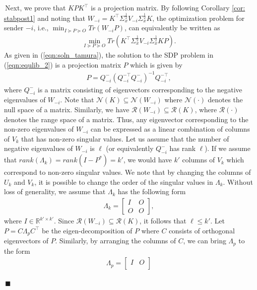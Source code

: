 \documentclass[12pt,journal,onecolumn]{IEEEtran}
\newenvironment{Proof}[1]{\medskip\par\noindent{\bf Proof:\,}\,#1}{{\mbox{\,$\blacksquare$}\par}}
\begin{document}
\begin{Proof}
Next, we prove that $KPK^\top$ is a projection matrix. By following Corollary \ref{cor: stabpost1} and noting that $W_{-i} =K^\top\Sigma_x^\frac{1}{2}V_{-i}\Sigma_x^{\frac{1}{2}}K $, the optimization problem for sender $-i$, i.e., $\min_{I\succeq P\succeq O} Tr(W_{-i}P)$, can equivalently be written as
\begin{align}\label{eqn:equlib_2}
    \min_{I\succeq P\succeq O} Tr(K^\top\Sigma_x^\frac{1}{2}V_{-i}\Sigma_x^{\frac{1}{2}}KP).
\end{align}
As given in (\ref{eqn:soln_tamura}), the solution to the SDP problem in (\ref{eqn:equlib_2}) is a projection matrix $P$ which is given by 
\begin{align}\label{eqn:projection_mat}
  P=Q_{-i}^{-}(Q_{-i}^{-\top} Q_{-i}^{-})^{-1}Q_{-i}^{-\top}, 
\end{align}
where $Q_{-i}^{-}$ is a matrix consisting of eigenvectors corresponding to the negative eigenvalues of $W_{-i}$. Note that $\mathcal{N}(K)\subseteq\mathcal{N}(W_{-i})$ where $\mathcal{N}(\cdot)$ denotes the null space of a matrix. Similarly, we have $\mathcal{R}(W_{-i})\subseteq\mathcal{R}(K)$, where $\mathcal{R}(\cdot)$ denotes the range space of a matrix. Thus, any eigenvector corresponding to the non-zero eigenvalues of $W_{-i}$ can be expressed as a linear combination of columns of $V_k$ that has non-zero singular values. Let us assume that the number of negative eigenvalues of $W_{-i}$ is $\ell$ (or equivalently $Q_{-i}^{-}$ has rank $\ell$). If we assume that $rank(\Lambda_k)=rank(I-P^*)=k'$, we would have $k'$ columns of $V_k$ which correspond to non-zero singular values. We note that by changing the columns of $U_k$ and $V_k$, it is possible to change the order of the singular values in $\Lambda_k$. Without loss of generality, we assume that $\Lambda_k$ has the following form  
\begin{align*}
   \Lambda_k=\begin{bmatrix}I & O\\
    O & O\end{bmatrix},
\end{align*}
where $I\in\mathbb{R}^{k'\times k'}$. Since $\mathcal{R}(W_{-i})\subseteq\mathcal{R}(K)$, it follows that $\ell\leq k'$. Let $P=C\Lambda_p C^\top$ be the eigen-decomposition of $P$ where $C$  consists of orthogonal eigenvectors of $P$. Similarly, by arranging the columns of $C$, we can bring $\Lambda_p$ to the form 
\begin{align*}
   \Lambda_p=\begin{bmatrix}I & O\\

\end{bmatrix}
\end{align*}
\end{Proof}
\end{document}
